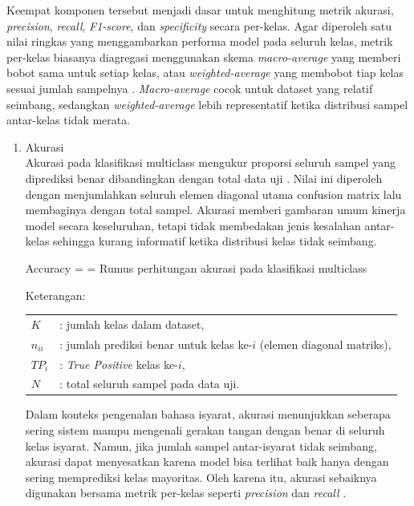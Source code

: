 Keempat komponen tersebut menjadi dasar untuk menghitung metrik akurasi, \textit{precision}, \textit{recall}, \textit{F1-score}, dan \textit{specificity} secara per-kelas. Agar diperoleh satu nilai ringkas yang menggambarkan performa model pada seluruh kelas, metrik per-kelas biasanya diagregasi menggunakan skema \textit{macro-average} yang memberi bobot sama untuk setiap kelas, atau \textit{weighted-average} yang membobot tiap kelas sesuai jumlah sampelnya \cite{Raschka2020}. \textit{Macro-average} cocok untuk dataset yang relatif seimbang, sedangkan \textit{weighted-average} lebih representatif ketika distribusi sampel antar-kelas tidak merata.\par

\begin{enumerate}
	\item Akurasi \\
	Akurasi pada klasifikasi multiclass mengukur proporsi seluruh sampel yang diprediksi benar dibandingkan dengan total data uji \cite{Raschka2020}. Nilai ini diperoleh dengan menjumlahkan seluruh elemen diagonal utama confusion matrix lalu membaginya dengan total sampel. Akurasi memberi gambaran umum kinerja model secara keseluruhan, tetapi tidak membedakan jenis kesalahan antar-kelas sehingga kurang informatif ketika distribusi kelas tidak seimbang.\\
	\vspace{0.5cm}
	\begin{equationcaptioned}[eq:2.accuracy]{
		Accuracy =  = 
	}{
		Rumus perhitungan akurasi pada klasifikasi multiclass
	}\end{equationcaptioned}
	\vspace{0.5cm}

	\noindent Keterangan:

	\begin{tabular}{@{}ll}
	$K$ & : jumlah kelas dalam dataset, \\
	$n_{ii}$ & : jumlah prediksi benar untuk kelas ke-$i$ (elemen diagonal matriks), \\
	$TP_i$ & : \textit{True Positive} kelas ke-$i$, \\
	$N$ & : total seluruh sampel pada data uji. \\
	\end{tabular}

	\vspace{0.5cm}
	Dalam konteks pengenalan bahasa isyarat, akurasi menunjukkan seberapa sering sistem mampu mengenali gerakan tangan dengan benar di seluruh kelas isyarat. Namun, jika jumlah sampel antar-isyarat tidak seimbang, akurasi dapat menyesatkan karena model bisa terlihat baik hanya dengan sering memprediksi kelas mayoritas. Oleh karena itu, akurasi sebaiknya digunakan bersama metrik per-kelas seperti \textit{precision} dan \textit{recall} \cite{Raschka2020}.\par



\end{enumerate}
